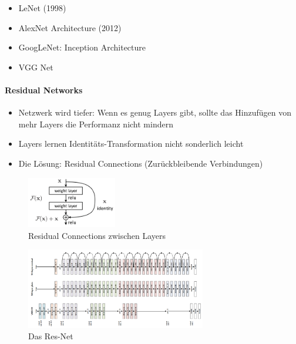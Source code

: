 \documentclass[a4paper]{article}
\begin{document}
		\begin{itemize}
			\item LeNet (1998)
			\item AlexNet Architecture (2012)
			\item GoogLeNet: Inception Architecture
			\item VGG Net
		\end{itemize}
		
		\paragraph{Residual Networks}
		
		\begin{itemize}
			\item Netzwerk wird tiefer: Wenn es genug Layers gibt, sollte das Hinzufügen von mehr Layers die Performanz nicht mindern
			\item Layers lernen Identitäts-Transformation nicht sonderlich leicht
			\item Die Lösung: Residual Connections (Zurückbleibende Verbindungen)
		\end{itemize}
	
		\begin{figure}[htb!]
			\centering
			\includegraphics[width=0.35\textwidth]{img/07_convolutional_nn/res_conn.png}
			\caption{Residual Connections zwischen Layers}
		\end{figure}
	
		\begin{figure}[htb!]
			\centering
			\includegraphics[width=0.7\textwidth]{img/07_convolutional_nn/res_net.png}
			\caption{Das Res-Net}
		\end{figure}
	
		\newpage
		
\end{document}
